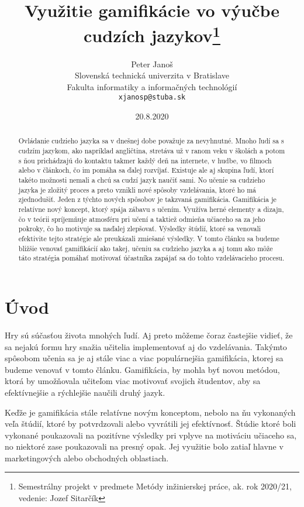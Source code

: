 \documentclass[10pt,oneside,slovak,a4paper]{article}
\title{Využitie gamifikácie vo výučbe cudzích jazykov\thanks{Semestrálny projekt v predmete Metódy inžinierskej práce, ak. rok 2020/21, vedenie: Jozef Sitarčík}} %
\author{Peter Janoš\\[2pt]
	{\small Slovenská technická univerzita v Bratislave}\\
	{\small Fakulta informatiky a informačných technológií}\\
	{\small \texttt{xjanosp@stuba.sk}}
	}
\date{\small 20.8.2020} %
\begin{document}
\maketitle

\begin{abstract}
Ovládanie cudzieho jazyka sa v dnešnej dobe považuje za nevyhnutné. Mnoho ľudí sa s cudzím jazykom, ako napríklad angličtina, stretáva už v ranom veku v školách a potom s ňou prichádzajú do kontaktu takmer každý deň na internete, v hudbe, vo filmoch alebo v článkoch, čo im pomáha sa ďalej rozvíjať. Existuje ale aj skupina ľudí, ktorí takéto možnosti nemali a chcú sa cudzí jazyk naučiť sami. No učenie sa cudzieho jazyka je zložitý proces a preto vznikli nové spôsoby vzdelávania, ktoré ho má zjednodušiť. Jeden z týchto nových spôsobov je takzvaná gamifikácia. Gamifikácia je relatívne nový koncept, ktorý spája zábavu s učením. Využíva herné elementy a dizajn, čo v teórii spríjemňuje atmosféru pri učení a taktiež odmieňa učiaceho sa za jeho pokroky, čo ho motivuje sa naďalej zlepšovať. Výsledky štúdií, ktoré sa venovali efektivite tejto stratégie ale preukázali zmiešané výsledky. V tomto článku sa budeme bližšie venovať gamifikácií ako takej, učeniu sa cudzieho jazyka a aj tomu ako môže táto stratégia pomáhať motivovať účastníka zapájať sa do tohto vzdelávacieho procesu.
\end{abstract}



\section{Úvod} \label{uvod}

Hry sú súčasťou života mnohých ľudí. Aj preto môžeme čoraz častejšie vidieť, že sa nejakú formu hry snažia učitelia implementovať aj do vzdelávania. Takýmto spôsobom učenia sa je aj stále viac a viac populárnejšia gamifikácia, ktorej sa budeme venovať v tomto článku. Gamifikácia, by mohla byť novou metódou, ktorá by umožňovala učiteľom viac motivovať svojich študentov, aby sa efektívnejšie a rýchlejšie naučili druhý jazyk. 

Keďže je gamifikácia stále relatívne novým konceptom, nebolo na ňu vykonaných veľa štúdií, ktoré by potvrdzovali alebo vyvrátili jej efektívnosť. Štúdie ktoré boli vykonané poukazovali na pozitívne výsledky pri vplyve na motiváciu učiaceho sa, no niektoré zase poukazovali na presný opak. Jej využitie bolo zatiaľ hlavne v marketingových alebo obchodných oblastiach. ~\cite{garland2015gamification}
\end{document}
